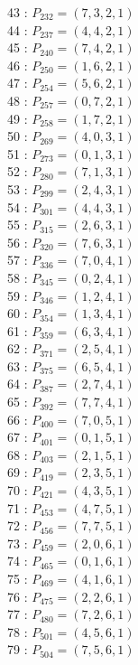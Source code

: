 \documentclass{article}
\begin{document}
{\begin{multicols}{3}
43 : $P_{232}=( 7, 3, 2, 1 )$\\
44 : $P_{237}=( 4, 4, 2, 1 )$\\
45 : $P_{240}=( 7, 4, 2, 1 )$\\
46 : $P_{250}=( 1, 6, 2, 1 )$\\
47 : $P_{254}=( 5, 6, 2, 1 )$\\
48 : $P_{257}=( 0, 7, 2, 1 )$\\
49 : $P_{258}=( 1, 7, 2, 1 )$\\
50 : $P_{269}=( 4, 0, 3, 1 )$\\
51 : $P_{273}=( 0, 1, 3, 1 )$\\
52 : $P_{280}=( 7, 1, 3, 1 )$\\
53 : $P_{299}=( 2, 4, 3, 1 )$\\
54 : $P_{301}=( 4, 4, 3, 1 )$\\
55 : $P_{315}=( 2, 6, 3, 1 )$\\
56 : $P_{320}=( 7, 6, 3, 1 )$\\
57 : $P_{336}=( 7, 0, 4, 1 )$\\
58 : $P_{345}=( 0, 2, 4, 1 )$\\
59 : $P_{346}=( 1, 2, 4, 1 )$\\
60 : $P_{354}=( 1, 3, 4, 1 )$\\
61 : $P_{359}=( 6, 3, 4, 1 )$\\
62 : $P_{371}=( 2, 5, 4, 1 )$\\
63 : $P_{375}=( 6, 5, 4, 1 )$\\
64 : $P_{387}=( 2, 7, 4, 1 )$\\
65 : $P_{392}=( 7, 7, 4, 1 )$\\
66 : $P_{400}=( 7, 0, 5, 1 )$\\
67 : $P_{401}=( 0, 1, 5, 1 )$\\
68 : $P_{403}=( 2, 1, 5, 1 )$\\
69 : $P_{419}=( 2, 3, 5, 1 )$\\
70 : $P_{421}=( 4, 3, 5, 1 )$\\
71 : $P_{453}=( 4, 7, 5, 1 )$\\
72 : $P_{456}=( 7, 7, 5, 1 )$\\
73 : $P_{459}=( 2, 0, 6, 1 )$\\
74 : $P_{465}=( 0, 1, 6, 1 )$\\
75 : $P_{469}=( 4, 1, 6, 1 )$\\
76 : $P_{475}=( 2, 2, 6, 1 )$\\
77 : $P_{480}=( 7, 2, 6, 1 )$\\
78 : $P_{501}=( 4, 5, 6, 1 )$\\
79 : $P_{504}=( 7, 5, 6, 1 )$\\

\end{multicols}}
\end{document}
